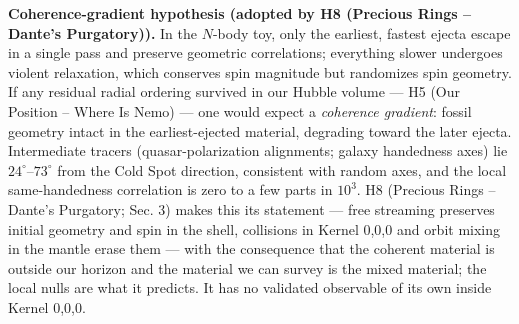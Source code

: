 \documentclass[
  11pt,
]{article}
\begin{document}
\textbf{Coherence-gradient hypothesis (adopted by H8 (Precious Rings --
Dante's Purgatory)).} In the \(N\)-body toy, only the earliest, fastest
ejecta escape in a single pass and preserve geometric correlations;
everything slower undergoes violent relaxation, which conserves spin
magnitude but randomizes spin geometry. If any residual radial ordering
survived in our Hubble volume --- H5 (Our Position -- Where Is Nemo) ---
one would expect a \emph{coherence gradient}: fossil geometry intact in
the earliest-ejected material, degrading toward the later ejecta.
Intermediate tracers (quasar-polarization alignments; galaxy handedness
axes) lie \(24^\circ\)--\(73^\circ\) from the Cold Spot direction,
consistent with random axes, and the local same-handedness correlation
is zero to a few parts in \(10^3\). H8 (Precious Rings -- Dante's
Purgatory; Sec. 3) makes this its statement --- free streaming preserves
initial geometry and spin in the shell, collisions in Kernel 0,0,0 and
orbit mixing in the mantle erase them --- with the consequence that the
coherent material is outside our horizon and the material we can survey
is the mixed material; the local nulls are what it predicts. It has no
validated observable of its own inside Kernel 0,0,0.
\end{document}
